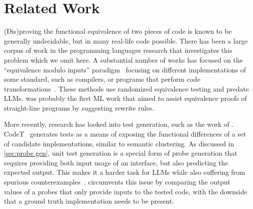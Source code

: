 \section{Related Work}
(Dis)proving the functional equivalence of two pieces of code is known to be generally undecidable, but in many real-life code possible. There has been a large corpus of work in the programming languages research that investigates this problem which we omit here.
A substantial number of works has focused on the ``equivalence modulo inputs'' paradigm~\citep{le2014compiler} focusing on different implementations of some standard, such as compilers, or programs that perform code transformations~\citep{daniel2007automated}.
These methods use randomized equivalence testing and predate LLMs.
\citet{kommrusch2023self} was probably the first ML work that aimed to assist equivalence proofs of straight-line programs by suggesting rewrite rules.

More recently, research has looked into test generation, such as the work of \citet{lemieux2023codamosa}. CodeT~\citep{chen2022codet} generates tests as a means of exposing the functional differences of a set of candidate implementations, similar to semantic clustering.
As discussed in \autoref{sec:probe gen}, unit test generation is a special form of probe generation that requires providing both input usage of an interface, but also predicting the expected output.
This makes it a harder task for LLMs while also suffering from spurious counterexamples~\citep{alshahwan2024automated}.
\probgen circumvents this issue by comparing the output values of a probes that only provide inputs to the tested code, with the downside that a ground truth implementation needs to be present.